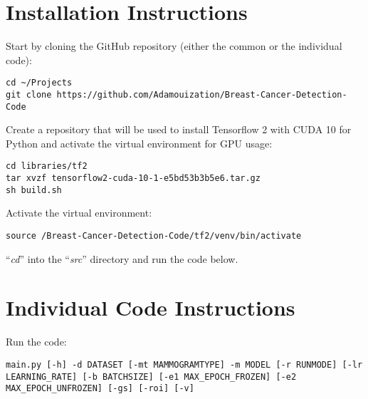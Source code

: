 \section{Installation Instructions}

Start by cloning the GitHub repository (either the common or the individual code):

\begin{lstlisting}
cd ~/Projects
git clone https://github.com/Adamouization/Breast-Cancer-Detection-Code
\end{lstlisting}

Create a repository that will be used to install Tensorflow 2 with CUDA 10 for Python and activate the virtual environment for GPU usage:

\begin{lstlisting}
cd libraries/tf2
tar xvzf tensorflow2-cuda-10-1-e5bd53b3b5e6.tar.gz
sh build.sh
\end{lstlisting}

Activate the virtual environment:

\begin{lstlisting}
source /Breast-Cancer-Detection-Code/tf2/venv/bin/activate
\end{lstlisting}

``\textit{cd}'' into the ``\textit{src}'' directory and run the code below.


\section{Individual Code Instructions}
\label{sec:appendix-individual-pipeline-instructions}

Run the code:

\begin{lstlisting}
main.py [-h] -d DATASET [-mt MAMMOGRAMTYPE] -m MODEL [-r RUNMODE] [-lr LEARNING_RATE] [-b BATCHSIZE] [-e1 MAX_EPOCH_FROZEN] [-e2 MAX_EPOCH_UNFROZEN] [-gs] [-roi] [-v]
\end{lstlisting}

